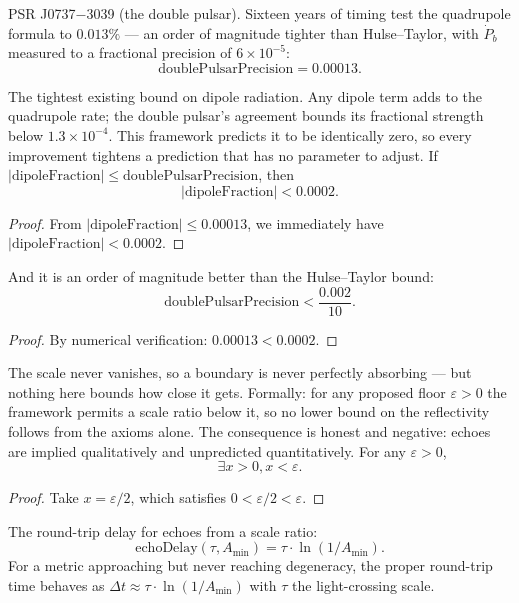 \begin{definition}
PSR J0737$-$3039 (the double pulsar). Sixteen years of timing test the quadrupole formula to $0.013\%$ — an order of magnitude tighter than Hulse–Taylor, with $\dot{P}_b$ measured to a fractional precision of $6 \times 10^{-5}$:
\[
\text{doublePulsarPrecision} = 0.00013.
\]
\end{definition}

\begin{theorem}
The tightest existing bound on dipole radiation. Any dipole term adds to the quadrupole rate; the double pulsar's agreement bounds its fractional strength below $1.3 \times 10^{-4}$. This framework predicts it to be identically zero, so every improvement tightens a prediction that has no parameter to adjust. If $|\text{dipoleFraction}| \leq \text{doublePulsarPrecision}$, then
\[
|\text{dipoleFraction}| < 0.0002.
\]
\begin{proof}
From $|\text{dipoleFraction}| \leq 0.00013$, we immediately have $|\text{dipoleFraction}| < 0.0002$.
\end{proof}
\end{theorem}

\begin{theorem}
And it is an order of magnitude better than the Hulse–Taylor bound:
\[
\text{doublePulsarPrecision} < \frac{0.002}{10}.
\]
\begin{proof}
By numerical verification: $0.00013 < 0.0002$.
\end{proof}
\end{theorem}

\begin{theorem}
The scale never vanishes, so a boundary is never perfectly absorbing — but nothing here bounds how close it gets. Formally: for any proposed floor $\varepsilon > 0$ the framework permits a scale ratio below it, so no lower bound on the reflectivity follows from the axioms alone. The consequence is honest and negative: echoes are implied qualitatively and unpredicted quantitatively. For any $\varepsilon > 0$,
\[
\exists x > 0, x < \varepsilon.
\]
\begin{proof}
Take $x = \varepsilon/2$, which satisfies $0 < \varepsilon/2 < \varepsilon$.
\end{proof}
\end{theorem}

\begin{definition}
The round-trip delay for echoes from a scale ratio:
\[
\text{echoDelay}(\tau, A_{\min}) = \tau \cdot \ln(1/A_{\min}).
\]
For a metric approaching but never reaching degeneracy, the proper round-trip time behaves as $\Delta t \approx \tau \cdot \ln(1/A_{\min})$ with $\tau$ the light-crossing scale.
\end{definition}

